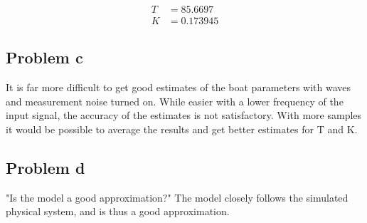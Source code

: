 \begin{align*}
    T &= 85.6697 \\
    K &= 0.173945
\end{align*}

\subsection{Problem c}
It is far more difficult to get good estimates of the boat parameters with waves and measurement noise
turned on. While easier with a lower frequency of the input signal, the accuracy of the estimates is not
satisfactory. With more samples it would be possible to average the results and get better estimates for
T and K. 

\subsection{Problem d}
"Is the model a good approximation?"
The model closely follows the simulated physical system, and is thus a good approximation.